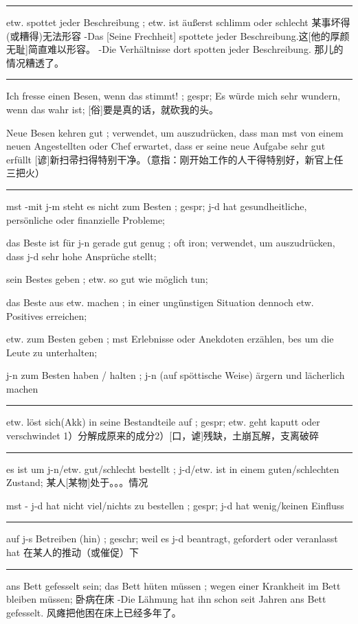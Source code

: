 \noindent\rule{\textwidth}{1pt} 
etw. spottet jeder Beschreibung ; etw. ist äußerst schlimm oder schlecht
某事坏得(或糟得)无法形容
-Das [Seine Frechheit] spottete jeder Beschreibung.这[他的厚颜无耻]简直难以形容。 
-Die Verhältnisse dort spotten jeder Beschreibung.  那儿的情况糟透了。

\noindent\rule{\textwidth}{1pt} 
Ich fresse einen Besen, wenn das stimmt! ; gespr; Es würde mich sehr wundern, wenn das wahr ist;
[俗]要是真的话，就砍我的头。

Neue Besen kehren gut ; verwendet, um auszudrücken, dass man mst von einem neuen Angestellten oder Chef erwartet, dass er seine neue Aufgabe sehr gut erfüllt
[谚]新扫帚扫得特别干净。（意指：刚开始工作的人干得特别好，新官上任三把火）

\noindent\rule{\textwidth}{1pt} 
mst -mit j-m steht es nicht zum Besten ; gespr; j-d hat gesundheitliche, persönliche oder finanzielle Probleme;

das Beste ist für j-n gerade gut genug ; oft iron; verwendet, um auszudrücken, dass j-d sehr hohe Ansprüche stellt;

sein Bestes geben ; etw. so gut wie möglich tun; 

das Beste aus etw. machen ; in einer ungünstigen Situation dennoch etw. Positives erreichen;

etw. zum Besten geben ; mst Erlebnisse oder Anekdoten erzählen, bes um die Leute zu unterhalten;

j-n zum Besten haben / halten ; j-n (auf spöttische Weise) ärgern und lächerlich machen

\noindent\rule{\textwidth}{1pt} 
etw. löst sich(Akk) in seine Bestandteile auf ; gespr; etw. geht kaputt oder verschwindet
1）分解成原来的成分2）[口，谑]残缺，土崩瓦解，支离破碎

\noindent\rule{\textwidth}{1pt} 
es ist um j-n/etw. gut/schlecht bestellt ; j-d/etw. ist in einem guten/schlechten Zustand;
某人[某物]处于。。。情况

mst - j-d hat nicht viel/nichts zu bestellen ; gespr; j-d hat wenig/keinen Einfluss

\noindent\rule{\textwidth}{1pt} 
auf j-s Betreiben (hin) ; geschr; weil es j-d beantragt, gefordert oder veranlasst hat
在某人的推动（或催促）下

\noindent\rule{\textwidth}{1pt} 
ans Bett gefesselt sein; das Bett hüten müssen ; wegen einer Krankheit im Bett bleiben müssen;
卧病在床
-Die Lähmung hat ihn schon seit Jahren ans Bett gefesselt. 风瘫把他困在床上已经多年了。

